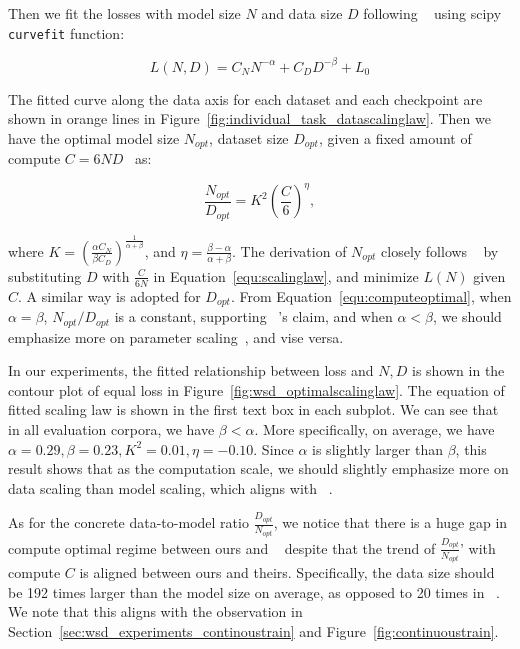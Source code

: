\documentclass[dvipsnames]{article}
\begin{document}
Then we fit the losses with model size $N$ and data size $D$ following ~\cite{hoffmann2022training} using scipy \texttt{curvefit} function:

\begin{equation}
    L(N, D) = C_NN^{-\alpha} + C_DD^{-\beta} + L_0
\label{equ:scalinglaw}
\end{equation}

The fitted curve along the data axis for each dataset and each checkpoint are shown in orange lines in Figure~\ref{fig:individual_task_datascalinglaw}.
Then we have the optimal model size $N_{opt}$, dataset size $D_{opt}$, given a fixed amount of compute $C=6ND$~\citep{rae2021scaling} as: 

\begin{equation}
    \frac{N_{opt}}{D_{opt}} = K^2\left(\frac{C}{6}\right)^{\eta},
\label{equ:computeoptimal}
\end{equation}

where $K = (\frac{\alpha C_N}{\beta C_D})^{\frac{1}{\alpha + \beta}} $, and $\eta=\frac{\beta-\alpha}{\alpha+\beta}$. The derivation of $N_{opt}$ closely follows ~\cite{hoffmann2022training} by substituting $D$ with $\frac{C}{6N}$ in Equation~\ref{equ:scalinglaw}, and minimize $L(N)$ given $C$.  A similar way is adopted for $D_{opt}$. 
From Equation~\ref{equ:computeoptimal}, when $\alpha = \beta$, $N_{opt}/D_{opt}$ is a constant, supporting ~\cite{hoffmann2022training}'s claim, and when $\alpha < \beta$, we should emphasize more on parameter scaling~\citep{kaplan2020scaling}, and vise versa. 

In our experiments, the fitted relationship between loss and $N, D$ is shown in the contour plot of equal loss in Figure~\ref{fig:wsd_optimalscalinglaw}. The equation of fitted scaling law is shown in the first text box in each subplot. We can see that in all evaluation corpora, we have $\beta < \alpha$. More specifically, on average, we have $\alpha=0.29, \beta=0.23, K^2 = 0.01, \eta=-0.10$. Since $\alpha$ is slightly larger than $\beta$, this result shows that as the computation scale, we should slightly emphasize more on data scaling than model scaling, which aligns with ~\cite{hoffmann2022training}.

As for the concrete data-to-model ratio $\frac{D_{opt}}{N_{opt}}$,  we notice that there is a huge gap in compute optimal regime between ours and ~\cite{hoffmann2022training} despite that the trend of $\frac{D_{opt}}{N_{opt}}$' with compute $C$ is aligned between ours and theirs. Specifically, the data size should be 192 times larger than the model size on average, as opposed to 20 times in ~\cite{hoffmann2022training}. We note that this aligns with the observation in Section~\ref{sec:wsd_experiments_continoustrain} and Figure~\ref{fig:continuoustrain}.
\end{document}
